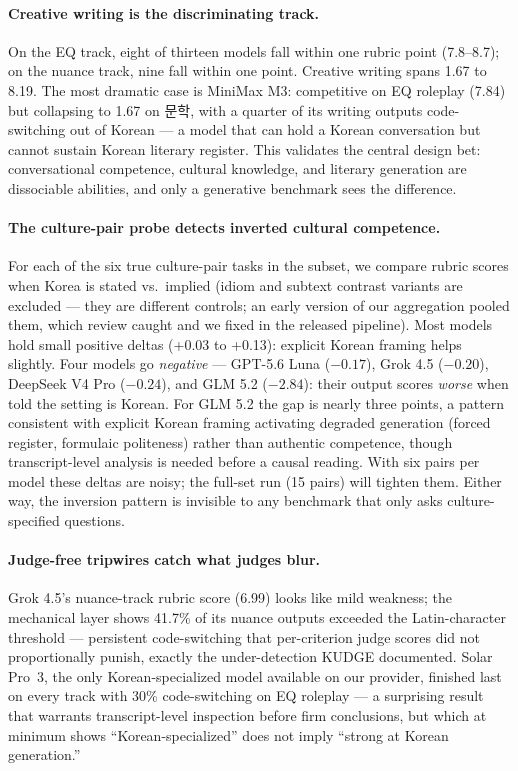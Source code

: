 \documentclass[11pt]{article}
\newcommand{\ko}[1]{#1}
\begin{document}
\paragraph{Creative writing is the discriminating track.} On the EQ track,
eight of thirteen models fall within one rubric point (7.8--8.7); on the
nuance track, nine fall within one point. Creative writing spans 1.67 to
8.19. The most dramatic case is MiniMax M3: competitive on EQ roleplay
(7.84) but collapsing to 1.67 on \ko{문학}, with a quarter of its writing
outputs code-switching out of Korean --- a model that can hold a Korean
conversation but cannot sustain Korean literary register. This validates
the central design bet: conversational competence, cultural knowledge, and
literary generation are dissociable abilities, and only a generative
benchmark sees the difference.

\paragraph{The culture-pair probe detects inverted cultural competence.}
For each of the six true culture-pair tasks in the subset, we compare
rubric scores when Korea is stated vs.\ implied (idiom and subtext
contrast variants are excluded --- they are different controls; an early
version of our aggregation pooled them, which review caught and we fixed
in the released pipeline). Most models hold small positive deltas (+0.03
to +0.13): explicit Korean framing helps slightly. Four models go
\emph{negative} --- GPT-5.6 Luna ($-0.17$), Grok 4.5 ($-0.20$), DeepSeek
V4 Pro ($-0.24$), and GLM 5.2 ($-2.84$): their output scores \emph{worse}
when told the setting is Korean. For GLM 5.2 the gap is nearly three
points, a pattern consistent with explicit Korean framing activating
degraded generation (forced register, formulaic politeness) rather than
authentic competence, though transcript-level analysis is needed before a
causal reading. With six pairs per model these deltas are noisy; the
full-set run (15 pairs) will tighten them. Either way, the inversion
pattern is invisible to any benchmark that only asks culture-specified
questions.

\paragraph{Judge-free tripwires catch what judges blur.} Grok 4.5's
nuance-track rubric score (6.99) looks like mild weakness; the mechanical
layer shows 41.7\% of its nuance outputs exceeded the Latin-character
threshold --- persistent code-switching that per-criterion judge scores
did not proportionally punish, exactly the under-detection KUDGE
documented. Solar Pro~3, the only Korean-specialized model available on
our provider, finished last on every track with 30\% code-switching on EQ
roleplay --- a surprising result that warrants transcript-level
inspection before firm conclusions, but which at minimum shows
``Korean-specialized'' does not imply ``strong at Korean generation.''
\end{document}
